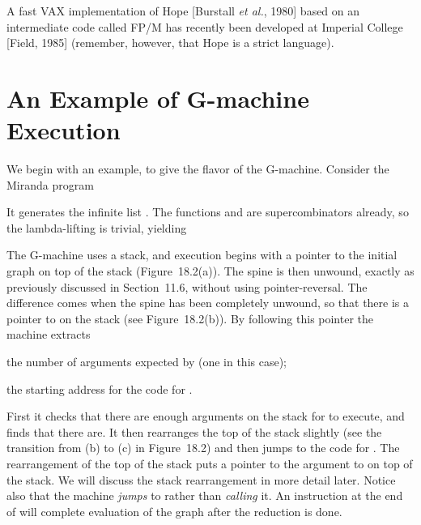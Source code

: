 A fast VAX implementation of Hope [Burstall \textit{et al.}, 1980] based on an
intermediate code called FP/M has recently been developed at Imperial
College [Field, 1985] (remember, however, that Hope is a strict language).

\section{An Example of G-machine Execution}

We begin with an example, to give the flavor of the G-machine. Consider the
Miranda program


\noindent
It generates the infinite list \ml{[1,2,3,\ldots,]}. The functions  and  are
supercombinators already, so the lambda-lifting is trivial, yielding


\noindent
The G-machine uses a stack, and execution begins with a pointer to the initial
graph on top of the stack (Figure~18.2(a)). The spine is then unwound, exactly
as previously discussed in Section~11.6, without using pointer-reversal. The
difference comes when the spine has been completely unwound, so that there
is a pointer to  on the stack (see Figure~18.2(b)). By following this
pointer the machine extracts

\begin{numbered}
    \item the number of arguments expected by  (one in this case);
    \item the starting address for the code for .
\end{numbered}

\noindent
First it checks that there are enough arguments on the stack for  to
execute, and finds that there are. It then rearranges the top of the stack
slightly (see the transition from (b) to (c) in Figure~18.2) and then jumps to the
code for . The rearrangement of the top of the stack puts a pointer to the
argument to  on top of the stack. We will discuss the stack rearrangement in more detail later. Notice also that the machine \textit{jumps} to  rather
than \textit{calling} it. An instruction at the end of  will complete evaluation of
the graph after the  reduction is done.


